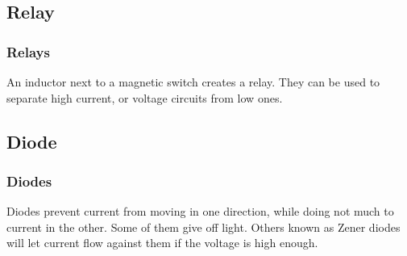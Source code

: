 \documentclass[10pt]{beamer}
\begin{document}
\subsection{Relay}
\begin{frame}
\frametitle{Relays}
An inductor next to a magnetic switch creates a relay. They can be used to separate high current, or voltage circuits from low ones.
\end{frame}

\subsection{Diode}
\begin{frame}
\frametitle{Diodes}
Diodes prevent current from moving in one direction, while doing not much to current in the other. Some of them give off light. Others known as Zener diodes will let current flow against them if the voltage is high enough.\\
\begin{center}

\end{center}
\end{frame}
\end{document}
